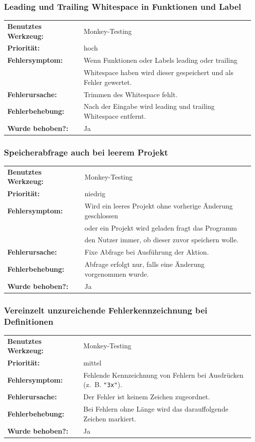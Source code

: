 \documentclass{article}
\begin{document}
\subsubsection*{Leading und Trailing Whitespace in Funktionen und Label}
\begin{tabular}{ll}
    \textbf{Benutztes Werkzeug:} & Monkey-Testing\\
    \textbf{Priorität:} & hoch\\
    \textbf{Fehlersymptom:} & Wenn Funktionen oder Labels leading oder trailing\\
    & Whitespace haben wird dieser gespeichert und als Fehler gewertet.\\
    \textbf{Fehlerursache:} & Trimmen des Whitespace fehlt.\\
    \textbf{Fehlerbehebung:} & Nach der Eingabe wird leading und trailing Whitespace entfernt.\\
    \textbf{Wurde behoben?:} & Ja\\
\end{tabular}

\subsubsection*{Speicherabfrage auch bei leerem Projekt}
\begin{tabular}{ll}
    \textbf{Benutztes Werkzeug:} & Monkey-Testing\\
    \textbf{Priorität:} & niedrig\\
    \textbf{Fehlersymptom:} & Wird ein leeres Projekt ohne vorherige Änderung geschlossen\\
    & oder ein Projekt wird geladen fragt das Programm\\
    &den Nutzer immer, ob dieser zuvor speichern wolle.\\
    \textbf{Fehlerursache:} & Fixe Abfrage bei Ausführung der Aktion.\\
    \textbf{Fehlerbehebung:} & Abfrage erfolgt nur, falls eine Änderung vorgenommen wurde.\\
    \textbf{Wurde behoben?:} & Ja\\
\end{tabular}

\subsubsection*{Vereinzelt unzureichende Fehlerkennzeichnung bei Definitionen}
\begin{tabular}{ll}
    \textbf{Benutztes Werkzeug:} & Monkey-Testing\\
    \textbf{Priorität:} & mittel\\
    \textbf{Fehlersymptom:} & Fehlende Kennzeichnung von Fehlern bei Ausdrücken (z.~B. \texttt{"3x"}).\\
    \textbf{Fehlerursache:} & Der Fehler ist keinem Zeichen zugeordnet.\\
    \textbf{Fehlerbehebung:} & Bei Fehlern ohne Länge wird das darauffolgende Zeichen markiert.\\
    \textbf{Wurde behoben?:} & Ja\\
\end{tabular}
\end{document}
